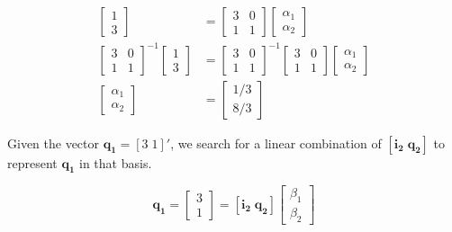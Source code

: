 \begin{align*}
\begin{bmatrix}
 1 \\3
\end{bmatrix}
& =
\begin{bmatrix}
 3 & 0\\
 1 & 1
\end{bmatrix}
\begin{bmatrix}
 \alpha_1 \\ \alpha_2
\end{bmatrix}\\
%
\begin{bmatrix}
 3 & 0\\
 1 & 1
\end{bmatrix}^{-1}
\begin{bmatrix}
 1 \\3
\end{bmatrix} &=
\begin{bmatrix}
 3 & 0\\
 1 & 1
\end{bmatrix}^{-1}
\begin{bmatrix}
 3 & 0\\
 1 & 1
\end{bmatrix}
\begin{bmatrix}
 \alpha_1 \\ \alpha_2
\end{bmatrix}\\
%
\begin{bmatrix}
 \alpha_1 \\ \alpha_2
\end{bmatrix}
 &=
 \begin{bmatrix}
1/3 \\
8/3
 \end{bmatrix}
\end{align*}


Given the vector $\mathbf{q_1} = [3 \; 1]'$, we search for a
linear combination of $[ \mathbf{i_2} \; \mathbf{q_2} ]$
to represent $\mathbf{q_1}$ in that basis.

\begin{equation*}
 \mathbf{q_1} = \begin{bmatrix}
                3\\1
               \end{bmatrix}
            = [\mathbf{i_2} \; \mathbf{q_2} ] \begin{bmatrix}
                                                \beta_1 \\ \beta_2
                                               \end{bmatrix}
\end{equation*}

